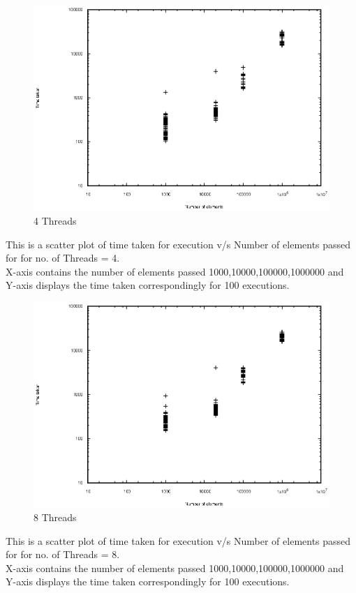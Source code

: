 \documentclass{article}
\begin{document}
\begin{figure}
\includegraphics[width=\linewidth]{scatter3.eps}
\caption{4 Threads}
\label{fig:Scatter3 graph}
\end{figure}
\noindent
This is a scatter plot of time taken for execution v/s Number of elements passed for for no. of Threads = 4. \\
X-axis contains the number of elements passed {1000,10000,100000,1000000} and Y-axis displays the time taken correspondingly for 100 executions.
\clearpage

\begin{figure}
\includegraphics[width=\linewidth]{scatter4.eps}
\caption{8 Threads}
\label{fig:Scatter4 graph}
\end{figure}
\noindent
This is a scatter plot of time taken for execution v/s Number of elements passed for for no. of Threads = 8. \\
X-axis contains the number of elements passed {1000,10000,100000,1000000} and Y-axis displays the time taken correspondingly for 100 executions.
\clearpage
\end{document}
